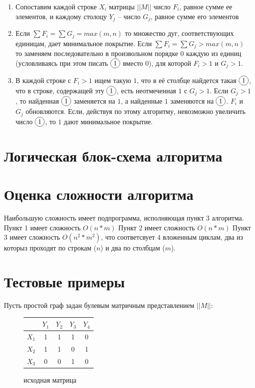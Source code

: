 \documentclass[12pt]{article}
\newcommand*\circled[1]{\tikz[baseline=(char.base)]{
            \node[shape=circle,draw,inner sep=2pt] (char) {#1};}}
\begin{document}
\begin{enumerate}
    \item Сопоставим каждой строке $X_i$ матрицы $||M||$
          число $F_i$, равное сумме ее элементов,
          и каждому столоцу $Y_j$ – число $G_j$, равное сумме
          его элементов
    \item Если $\sum F_i = \sum G_j = max(m, n)$ то
          множество дуг, соответствующих единицам,
          дает минимальное покрытие. Если
          $\sum F_i = \sum G_j > max(m, n)$
          то заменяем последовательно
          в произвольном порядке $0$ каждую из единиц
          (условливаясь при этом писать $\circled{1}$ вместо $0$),
          для которой $F_i > 1$ и $G_j > 1$.
    \item В каждой строке с $F_i > 1$ ищем такую
          $1$, что в её столбце найдется
          такая $\circled{1}$, что в строке,
          содержащей эту $\circled{1}$, есть неотмеченная $1$
          с $G_j > 1$. Если $G_j > 1$, то найденная $\circled{1}$
          заменяется на $1$, а найденные $1$ заменяются на
          $\circled{1}$. $F_i$ и $G_j$ обновляются.
          Если, действуя по этому алгоритму,
          невозможно увеличить число $\circled{1}$,
          то $1$ дают минимальное покрытие.
\end{enumerate}

\section{Логическая блок-схема алгоритма}

\section{Оценка сложности алгоритма}

Наибольшую сложность имеет подпрограмма, исполняющая
пункт 3 алгоритма. Пункт 1 имеет сложность $O(n * m)$
Пункт 2 имеет сложность $O(n * m)$
Пункт 3 имеет сложность $O(n^2 * m^2)$, что соответсвует $4$
вложенным циклам, два из которыз проходят по строкам ($n$) и
два по столбцам ($m$).

\section{Тестовые примеры}

Пусть простой граф задан булевым матричным представлением $||M||$:

\begin{figure}[H]
    \centering
    \begin{tabular}{ c|c|c|c|c| }
              & $Y_1$ & $Y_2$ & $Y_3$ & $Y_4$ \\
        \hline
        $X_1$ & 1     & 1     & 1     & 0     \\
        \hline
        $X_2$ & 1     & 1     & 0     & 1     \\
        \hline
        $X_3$ & 0     & 0     & 1     & 0     \\
        \hline
    \end{tabular}
    \label{fig:table1}
    \caption{исходная матрица}
\end{figure}
\end{document}
